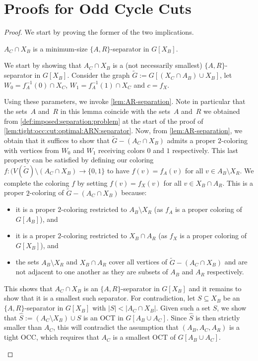 \section{Proofs for Odd Cycle Cuts} 
\label{sec:proofs:oct:cut}

\lemOCCARNSeparators*
\begin{proof}
	We start by proving the former of the two implications.
	
	\begin{claim} \label{clm:tight:occ:cut:optimal:AR:separtor}
		$A_C \cap X_B$ is a minimum-size $\{A, R\}$-separator in $G[X_B]$.
	\end{claim}
	\begin{claimproof}
		We start by showing that $A_C \cap X_B$ is a (not necessarily smallest) $\{A, R\}$-separator in $G[X_B]$. Consider the graph $\widetilde{G} := G[(X_C \cap A_B) \cup X_B]$, let $W_0 = f_A^{-1}(0) \cap X_C$, $W_1 = f_A^{-1}(1) \cap X_C$ and $c = f_X$.
		
		Using these parameters, we invoke \cref{lem:AR-separation}. Note in particular that the sets~$A$ and~$R$ in this lemma coincide with the sets~$A$ and~$R$ we obtained from \cref{def:imposed:separation:problem} at the start of the proof of \cref{lem:tight:occ:cut:optimal:ARN:separator}. Now, from \cref{lem:AR-separation}, we obtain that it suffices  to show that $\widetilde{G} - (A_C \cap X_B)$ admits a proper $2$-coloring with vertices from $W_0$ and $W_1$ receiving colors $0$ and $1$ respectively. This last property can be satisfied by defining our coloring $f: (V(\widetilde{G}) \setminus (A_C \cap X_B) \rightarrow \{0, 1\}$ to have $f(v) = f_A(v)$ for all $v \in A_B \setminus X_R$. We complete the coloring $f$ by setting $f(v) = f_X(v)$ for all $v \in X_B \cap A_R$. This is a proper $2$-coloring of $\widetilde{G} - (A_C \cap X_B)$ because:
		\begin{itemize}
			\item it is a proper $2$-coloring restricted to $A_B \setminus X_R$ (as $f_A$ is a proper coloring of $G[A_B]$), and
			\item it is a proper $2$-coloring restricted to $X_B \cap A_R$ (as $f_X$ is a proper coloring of $G[X_B]$), and
			\item the sets $A_B \setminus X_R$ and $X_B \cap A_R$ cover all vertices of $\widetilde{G} - (A_C \cap X_B)$ and are not adjacent to one another as they are subsets of $A_B$ and $A_R$ respectively.
		\end{itemize}
		This shows that $A_C \cap X_B$ is an $\{A, R\}$-separator in $G[X_B]$ and it remains to show that it is a smallest such separator. For contradiction, let $S \subseteq X_B$ be an $\{A, R\}$-separator in $G[X_B]$ with $|S| < |A_C \cap X_B|$. Given such a set $S$, we show that $\widehat{S} := (A_C \setminus X_B) \cup S$ is an OCT in $G[A_B \cup A_C]$. Since $\widehat{S}$ is then strictly smaller than $A_C$, this will contradict the assumption that $(A_B, A_C, A_R)$ is a tight OCC, which requires that $A_C$ is a smallest OCT of $G[A_B \cup A_C]$.
		

\end{claimproof}
\end{proof}
